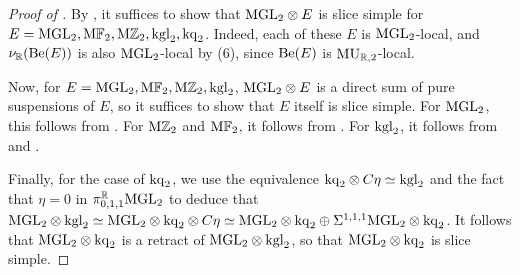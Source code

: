%
%
%
%
\begin{proof}[Proof of ]
  By , it suffices to show that $\mathrm{MGL}_2 \otimes E$ is slice simple for $E=\mathrm{MGL}_2, \mathrm{M}\mathbb{F}_2, \mathrm{M}\mathbb{Z}_{2}, \mathrm{kgl}_2, \mathrm{kq}_2$. Indeed, each of these $E$ is $\mathrm{MGL}_2$-local, and $\nu_{\mathbb{R}}(\mathrm{Be}(E))$ is also $\mathrm{MGL}_2$-local by (6), since $\mathrm{Be}(E)$ is $\operatorname{\mathrm{MU}}_{\mathbb{R}, 2}$-local.

  Now, for $E=\mathrm{MGL}_2, \mathrm{M}\mathbb{F}_2, \mathrm{M}\mathbb{Z}_{2}, \mathrm{kgl}_2$, $\mathrm{MGL}_2 \otimes E$ is a direct sum of pure suspensions of $E$, so it suffices to show that $E$ itself is slice simple.
  For $\mathrm{MGL}_2$, this follows from . For $\mathrm{M}\mathbb{Z}_{2}$ and $\mathrm{M}\mathbb{F}_2$, it follows from .
  For $\mathrm{kgl}_2$, it follows from  and \cite[Theorem 1.1]{SliceComp}.

%
  Finally, for the case of $\mathrm{kq}_2$, we use the equivalence $\mathrm{kq}_2 \otimes C\eta \simeq \mathrm{kgl}_2$ and the fact that $\eta = 0$ in $\pi_{0,1,1} ^{\mathbb{R}} \mathrm{MGL}_2$ to deduce that $\mathrm{MGL}_2 \otimes \mathrm{kgl}_2 \simeq \mathrm{MGL}_2 \otimes \mathrm{kq}_2 \otimes C\eta \simeq \mathrm{MGL}_2 \otimes \mathrm{kq}_2 \oplus \Sigma^{1,1,1} \mathrm{MGL}_2 \otimes \mathrm{kq}_2$.
  It follows that $\mathrm{MGL}_2 \otimes \mathrm{kq}_2$ is a retract of $\mathrm{MGL}_2 \otimes \mathrm{kgl}_2$, so that $\mathrm{MGL}_2 \otimes \mathrm{kq}_2$ is slice simple.
\end{proof}
